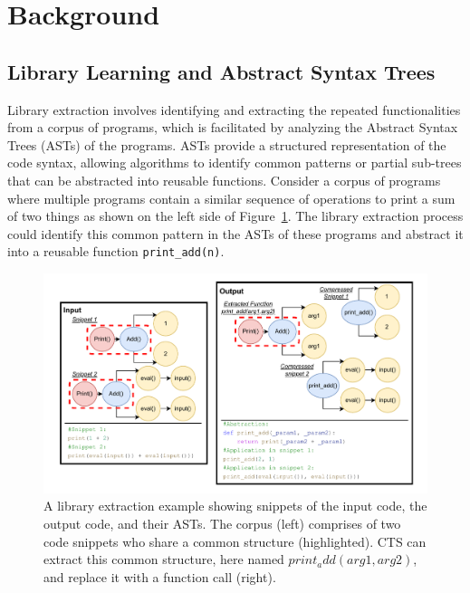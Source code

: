 \section{Background}
\label{sec:background}

\subsection{Library Learning and Abstract Syntax Trees}
Library extraction involves identifying and extracting the repeated functionalities from a corpus of programs, which is facilitated by analyzing the Abstract Syntax Trees (ASTs) of the programs. ASTs provide a structured representation of the code syntax, allowing algorithms to identify common patterns or partial sub-trees that can be abstracted into reusable functions. Consider a corpus of programs where multiple programs contain a similar sequence of operations to print a sum of two things as shown on the left side of Figure~\ref{figure:LibAbsAST}. The library extraction process could identify this common pattern in the ASTs of these programs and abstract it into a reusable function \texttt{print\_add(n)}. 



\begin{figure}[h]
  \centering
  \includegraphics[width=\linewidth]{images/LibAbsAST.pdf}
  \caption{A library extraction example showing snippets of the input code, the output code, and their ASTs. The corpus (left) comprises of two code snippets who share a common structure (highlighted). CTS can extract this common structure, here named $print_add(arg1,arg2)$, and replace it with a function call (right).  }
  \label{figure:LibAbsAST}
\end{figure}

